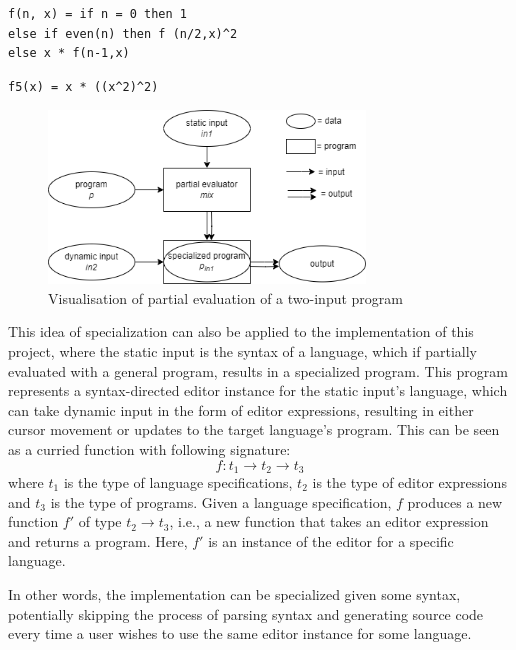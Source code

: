 \begin{lstlisting}[style=inline,label={lst:jones-ex1},caption={Two-input program $p$}]
f(n, x) = if n = 0 then 1
else if even(n) then f (n/2,x)^2
else x * f(n-1,x)
\end{lstlisting}

\begin{lstlisting}[style=inline,label={lst:jones-ex2},caption={Specialization of program $p$}]
f5(x) = x * ((x^2)^2)
\end{lstlisting}

\begin{figure}[H]
    \centering
    \includegraphics[width=0.75\textwidth]{img/partial-eval.drawio.png}
    \caption{Visualisation of partial evaluation of a two-input program}
    \label{fig:partial-eval-ex}
\end{figure}

This idea of specialization can also be applied to the implementation of this project, where the static input is the syntax of a language, which if partially evaluated with a general program, results in a specialized program. This program represents a syntax-directed editor instance for the static input's language, which can take dynamic input in the form of editor expressions, resulting in either cursor movement or updates to the target language's program. This can be seen as a curried function with following signature:
$$
    f : t_1 \rightarrow t_2 \rightarrow t_3
$$
where $t_1$ is the type of language specifications, $t_2$ is the type of editor expressions and $t_3$ is the type of programs. Given a language specification, $f$ produces a new function $f'$ of type $t_2 \rightarrow t_3$, i.e., a new function that takes an editor expression and returns a program. Here, $f'$ is an instance of the editor for a specific language.

In other words, the implementation can be specialized given some syntax, potentially skipping the process of parsing syntax and generating source code every time a user wishes to use the same editor instance for some language.